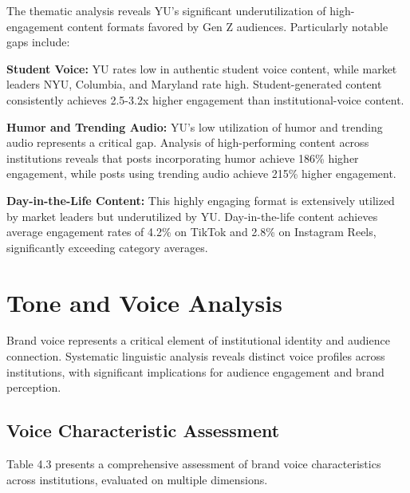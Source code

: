 \documentclass[12pt]{report}
\begin{document}
The thematic analysis reveals YU's significant underutilization of high-engagement content formats favored by Gen Z audiences. Particularly notable gaps include:

\textbf{Student Voice:} YU rates low in authentic student voice content, while market leaders NYU, Columbia, and Maryland rate high. Student-generated content consistently achieves 2.5-3.2x higher engagement than institutional-voice content.

\textbf{Humor and Trending Audio:} YU's low utilization of humor and trending audio represents a critical gap. Analysis of high-performing content across institutions reveals that posts incorporating humor achieve 186\% higher engagement, while posts using trending audio achieve 215\% higher engagement.

\textbf{Day-in-the-Life Content:} This highly engaging format is extensively utilized by market leaders but underutilized by YU. Day-in-the-life content achieves average engagement rates of 4.2\% on TikTok and 2.8\% on Instagram Reels, significantly exceeding category averages.

\chapter{Tone and Voice Analysis}

Brand voice represents a critical element of institutional identity and audience connection. Systematic linguistic analysis reveals distinct voice profiles across institutions, with significant implications for audience engagement and brand perception.

\section{Voice Characteristic Assessment}

Table 4.3 presents a comprehensive assessment of brand voice characteristics across institutions, evaluated on multiple dimensions.
\end{document}

